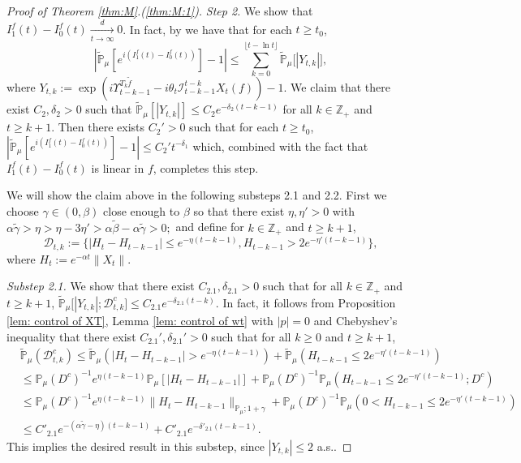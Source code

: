 \documentclass[EJP]{ejpecp} %
\begin{document}
\begin{proof}[Proof of Theorem \ref{thm:M}.(\ref{thm:M:1})]
	\emph{Step 2.} We show that $I^f_1(t) - I^f_0(t) \xrightarrow[t\to \infty]{d} 0$.
	In fact,  by \cite[Lemma 3.4.3]{Durrett2010Probability} we have that for each $t\geq t_0$,
\begin{equation}
\label{eq:PM:S:1}
    |\mathbb{\widetilde{P}}_{\mu}[e^{i (I^f_1(t) - I^f_0(t) ) }] - 1|
    \leq \sum_{k=0}^{\lfloor t-\ln t \rfloor}\mathbb{\widetilde{P}}_{\mu}\big[|Y_{t,k}|\big],
\end{equation}
	where $ Y_{t,k} := \exp(i \Upsilon_{t-k-1}^{T_{k} \tilde f} - i\theta_t \mathcal I_{t-k-1}^{t-k} X_t(f)) - 1. $
	We claim that there exist $C_2, \delta_2>0$ such that \(\widetilde {\mathbb P}_\mu [|Y_{t,k}|] \leq C_2 e^{-\delta_2 (t-k-1)}\) for all $k\in \mathbb Z_+$ and $t\geq k+1$.
	Then  there exists $C_2'>0$ such that for each  $t \geq t_0$, $|\mathbb{\widetilde{P}}_{\mu}[e^{i (I^f_1(t)- I^f_0(t))}]-1| \leq C_2't^{-\delta_1}$  which, combined with the fact that $I^f_1(t) - I^f_0(t)$ is linear in $f$, completes this step.

	We will show the claim above  in the following substeps 2.1 and 2.2.
 	First we choose $\gamma \in (0,\beta)$ close enough to $\beta$ so that there exist $\eta,\eta'>0$ with $ \alpha \tilde \gamma > \eta > \eta - 3\eta' > \alpha \tilde \beta - \alpha \tilde \gamma > 0;$ and define for  $k \in \mathbb Z_+$ and $t\geq k+1$,
\[
    \mathcal{D}_{t,k}
    :=\{|H_t-H_{t-k-1}|\leq  e^{-\eta (t-k-1)}, H_{t-k-1}> 2e^{-\eta' (t-k-1)}\},
\]
	where $H_t := e^{-\alpha t}\|X_t\|$.

	\emph{Substep 2.1.} We show that there exist $C_{2.1},\delta_{2.1} >0$ such that for all $k \in \mathbb Z_+$ and $t\geq k+1$, $ \mathbb{\widetilde{P}}_{\mu} \big[ |Y_{t,k}| ;\mathcal{D}^c_{t,k} \big] \leq C_{2.1} e^{-\delta_{2.1} (t-k)}.$
  	In fact, it follows from Proposition \ref{lem: control of XT}, Lemma \ref{lem: control of wt} with $|p|=0$ and Chebyshev's inequality that there exist $C_{2.1}', \delta_{2.1}'>0$ such that for all $k \geq 0$ and $t\geq k+1$,
\begin{align}
\label{eq: prob of Dtkc}
    & \mathbb{\widetilde{P}}_{\mu}(\mathcal{D}_{t,k}^c)
    \leq \mathbb{\widetilde{P}}_{\mu}(|H_t-H_{t-k-1}| > e^{-\eta (t-k-1)})+\mathbb{\widetilde{P}}_{\mu}(H_{t-k-1}\leq 2e^{-\eta'(t-k-1)}) \\
    & \leq \mathbb{P}_{\mu}(D^c)^{-1}e^{\eta(t-k-1)}\mathbb{P}_{\mu}[|H_t-H_{t-k-1}|] +  \mathbb{P}_{\mu}(D^c)^{-1} \mathbb P_\mu(H_{t-k-1}\leq 2e^{-\eta'(t-k-1)}; D^c) \\
    & \leq \mathbb{P}_{\mu}(D^c)^{-1}  e^{\eta(t-k-1)}\|H_t - H_{t-k-1}\|_{\mathbb P_\mu; 1+\gamma} + \mathbb{P}_{\mu}(D^c)^{-1} \mathbb P_\mu(0<H_{t-k-1}\leq 2e^{-\eta'(t-k-1)}) \\
    & \leq C'_{2.1} e^{-(\alpha \tilde \gamma - \eta)(t-k-1)}+C'_{2.1} e^{-\delta'_{2.1}(t-k-1)}.
\end{align}
  	This implies the desired result in this substep, since $|Y_{t,k}| \leq 2$ a.s..


\end{proof}
\end{document}
